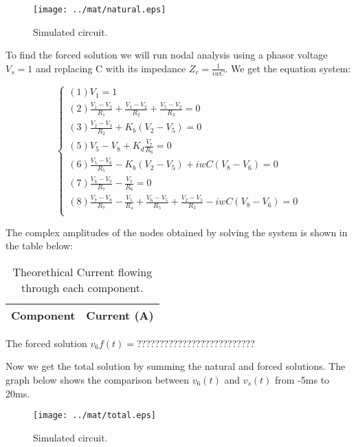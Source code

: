 \begin{figure}[H] \centering
\texttt{[image: ../mat/natural.eps]}
\caption{Simulated circuit.}
\label{fig:sim_op}
\end{figure}


To find the forced solution we will run nodal analysis using a phasor voltage $V_s=1$ and replacing C with its impedance $Z_c=\frac{1}{iwC}$. We get the equation system:

\begin{equation}\label{eq:nodeForced}
  \begin{cases}
  (1) V_1 = 1 \\
  (2) \frac{V_1 - V_2}{R_1} + \frac{V_3 - V_2}{R_2} + \frac{V_5 - V_2}{R_3} = 0 \\
  (3) \frac{V_2 - V_3}{R_2} + K_b(V_2 - V_5) = 0 \\
  (5) V_5 - V_8 + K_d\frac{V_7}{R_6} = 0 \\
  (6) \frac{V_5 - V_6}{R_5} - K_b(V_2-V_5) + iwC(V_8-V_6)= 0 \\
  (7) \frac{V_8 - V_7}{R_7} - \frac{V_7}{R_6} = 0 \\
  (8) \frac{V_7 - V_8}{R_7} - \frac{V_5}{R_4} + \frac{V_6 - V_5}{R_5} + \frac{V_2 - V_5}{R_3} - iwC(V_8-V_6) = 0 \\
\end{cases}
\end{equation}

The complex amplitudes of the nodes obtained by solving the system is shown in the table below:

\begin{table}[H]
  \centering
  \begin{tabular}{|l|r|}
    \hline
        {\bf Component} & {\bf Current (A)} \\ \hline
        
  \end{tabular}
  \caption{Theorethical Current flowing through each component.}
  \label{tab:comp}
\end{table}
\par

The forced solution $v_6f(t)=$??????????????????????????

Now we get the total solution by summing the natural and forced solutions.
The graph below shows the comparison between $v_6(t)$ and $v_s(t)$ from -5ms to 20ms.

\begin{figure}[H] \centering
\texttt{[image: ../mat/total.eps]}
\caption{Simulated circuit.}
\label{fig:sim_op}
\end{figure}



